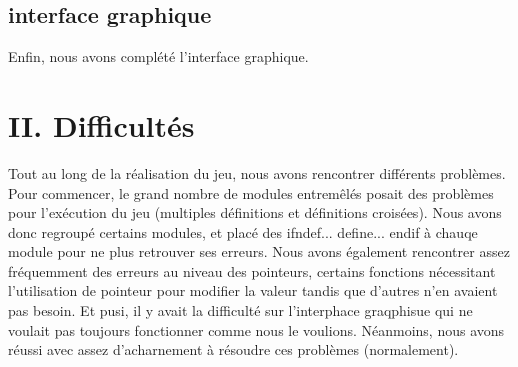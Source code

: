 \documentclass[a4paper, 11pt]{report}
\begin{document}
\subsection{interface graphique}
Enfin, nous avons complété l'interface graphique.

\section{II. Difficultés}
Tout au long de la réalisation du jeu, nous avons rencontrer différents problèmes. Pour commencer, le grand nombre de modules entremêlés posait des problèmes pour l'exécution du jeu (multiples définitions et définitions croisées). Nous avons donc regroupé certains modules, et placé des ifndef... define... endif à chauqe module pour ne plus retrouver ses erreurs.
Nous avons également rencontrer assez fréquemment des erreurs au niveau des pointeurs, certains fonctions nécessitant l'utilisation de pointeur pour modifier la valeur tandis que d'autres n'en avaient pas besoin.
Et pusi, il y avait la difficulté sur l'interphace graqphisue qui ne voulait pas toujours fonctionner comme nous le voulions.
Néanmoins, nous avons réussi avec assez d'acharnement à résoudre ces problèmes (normalement).
\end{document}
